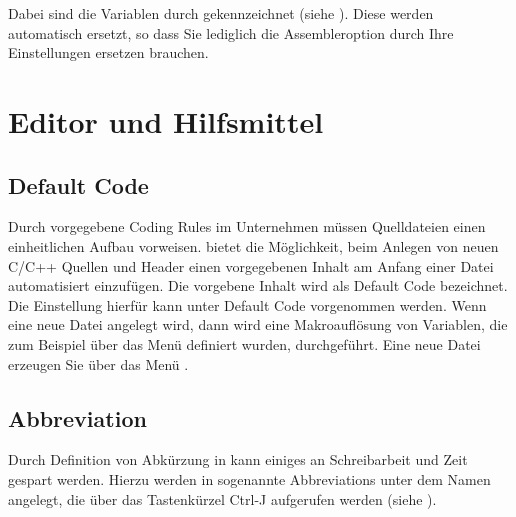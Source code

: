 Dabei sind die \codeblocks Variablen durch \codeline{$} gekennzeichnet (siehe ). Diese werden automatisch ersetzt, so dass Sie lediglich die Assembleroption  durch Ihre Einstellungen ersetzen brauchen.

\section{Editor und Hilfsmittel}

\subsection{Default Code}

Durch vorgegebene Coding Rules im Unternehmen müssen Quelldateien einen einheitlichen Aufbau vorweisen. \codeblocks bietet die Möglichkeit, beim Anlegen von neuen C/C++ Quellen und Header einen vorgegebenen Inhalt am Anfang einer Datei automatisiert einzufügen. Die vorgebene Inhalt wird als Default Code bezeichnet. Die Einstellung hierfür kann unter  Default Code vorgenommen werden. Wenn eine neue Datei angelegt wird, dann wird eine Makroauflösung von Variablen, die zum Beispiel über das Menü  definiert wurden, durchgeführt. Eine neue Datei erzeugen Sie über das Menü .



\subsection{Abbreviation}\label{sec:abbreviation}

Durch Definition von Abkürzung in \codeblocks kann einiges an Schreibarbeit und Zeit gespart werden. Hierzu werden in  sogenannte Abbreviations unter dem Namen  angelegt, die über das Tastenkürzel Ctrl-J aufgerufen werden (siehe ).

